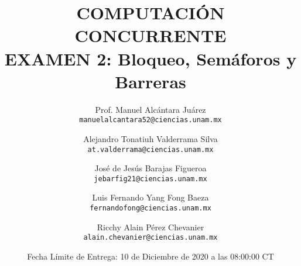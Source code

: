 \documentclass[a4paper,11pt]{article}
\begin{document}
    \title{COMPUTACIÓN CONCURRENTE \\ {\Large EXAMEN 2: Bloqueo, Semáforos y Barreras}}
    \author{
        Prof. Manuel Alcántara Juárez \\
        \texttt{manuelalcantara52@ciencias.unam.mx}
        \and
        Alejandro Tonatiuh Valderrama Silva \\
        \texttt{at.valderrama@ciencias.unam.mx}
        \and
        José de Jesús Barajas Figueroa \\
        \texttt{jebarfig21@ciencias.unam.mx}
        \and
        Luis Fernando Yang Fong Baeza \\
        \texttt{fernandofong@ciencias.unam.mx}
        \and
        Ricchy Alain Pérez Chevanier \\
        \texttt{alain.chevanier@ciencias.unam.mx}
    }
    \date{Fecha Límite de Entrega: 10 de Diciembre de 2020 a las 08:00:00 CT}
        
        \maketitle
        \pagestyle{fancy}

        \fancyhf{}
        \fancyfoot[c]{\thepage}
\end{document}
